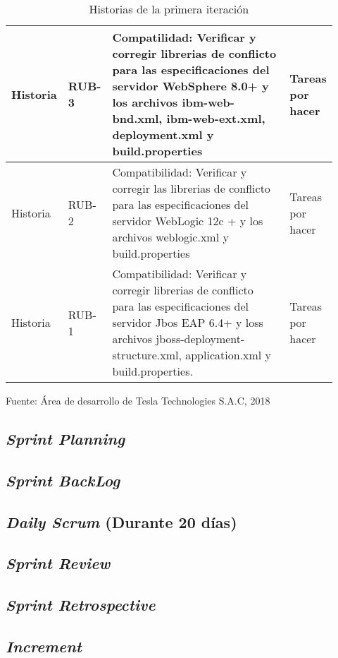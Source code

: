\begin{spacing}{1.5}
\begin{table}[bth]
\begin{tabular}[H]{m{0.1\linewidth}m{0.1\linewidth}|m{0.6\linewidth} m{0.12\linewidth}}
			\hline
			Historia &RUB-3 &Compatilidad: Verificar y corregir librerias de conflicto para las especificaciones del servidor WebSphere 8.0+ y los archivos ibm-web-bnd.xml, ibm-web-ext.xml, deployment.xml y build.properties &Tareas por hacer\\
			\hline
			Historia &RUB-2 &Compatibilidad: Verificar y corregir las librerias de conflicto para las especificaciones del servidor WebLogic 12c + y los archivos weblogic.xml y build.properties &Tareas por hacer\\
			\hline
			Historia &RUB-1 &Compatibilidad: Verificar y corregir librerias de conflicto para las especificaciones del servidor Jbos EAP 6.4+ y loss archivos jboss-deployment-structure.xml, application.xml y build.properties. &Tareas por hacer\\
			\hline
		\end{tabular}
	\caption{Historias de la primera iteraci\'{o}n}
	\small {Fuente: \'{A}rea de desarrollo de Tesla Technologies S.A.C, 2018}
	\label{table:III_1}
	\end{table}

	\subsection{\textit{Sprint Planning}}
	\subsection{\textit{Sprint BackLog}}
	\subsection{\textit{Daily Scrum} (Durante 20 d\'{i}as)}
	\subsection{\textit{Sprint Review}}
	\subsection{\textit{Sprint Retrospective}}
	
	\subsection{\textit{Increment}}
\end{spacing}